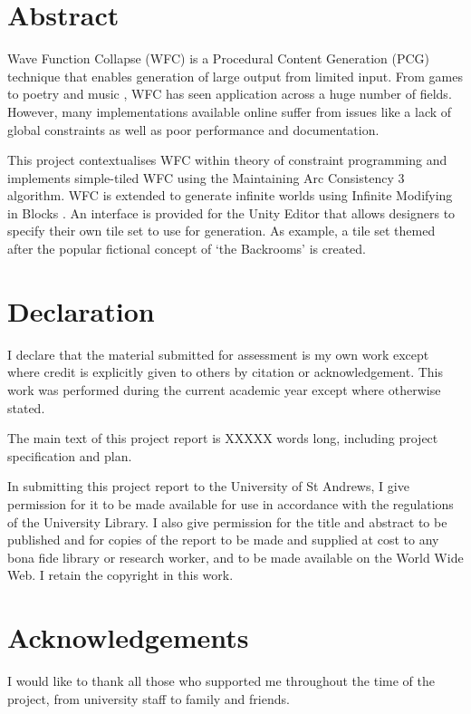\section*{Abstract}
Wave Function Collapse (WFC) is a Procedural Content Generation (PCG) technique that enables generation of large output from limited input. From games \cite{townscaper,badnorth,cavesofqud} to poetry \cite{WFC_poetry} and music \cite{WFC_music,WFC_music_2}, WFC has seen application across a huge number of fields. However, many implementations available online suffer from issues like a lack of global constraints as well as poor performance and documentation.

This project contextualises WFC within theory of constraint programming and implements simple-tiled WFC using the Maintaining Arc Consistency 3 algorithm. WFC is extended to generate infinite worlds using Infinite Modifying in Blocks \cite{Infinite_Modifying_In_Blocks}. An interface is provided for the Unity Editor that allows designers to specify their own tile set to use for generation. As example, a tile set themed after the popular fictional concept of `the Backrooms' is created.


\section*{Declaration}
I declare that the material submitted for assessment is my own work except where credit is explicitly given to others by citation or acknowledgement. This work was performed during the current academic year except where otherwise stated.
\par \vspace{\baselineskip}
The main text of this project report is XXXXX words
long, including project specification and plan.
\par \vspace{\baselineskip}
In submitting this project report to the University of St
Andrews, I give permission for it to be made available
for use in accordance with the regulations of the University
Library. I also give permission for the title and abstract
to be published and for copies of the report to be made and
supplied at cost to any bona fide library or research worker,
and to be made available on the World Wide Web. I retain the copyright in this work.

\section*{Acknowledgements}
I would like to thank all those who supported me throughout the time of the project, from university staff to family and friends.